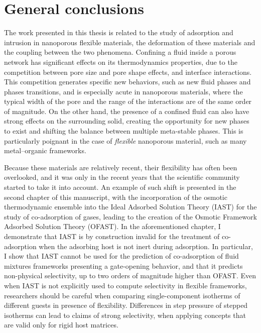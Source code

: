 
\chapter*{General conclusions}

The work presented in this thesis is related to the study of adsorption and
intrusion in nanoporous flexible materials, the deformation of these materials
and the coupling between the two phenomena. Confining a fluid inside a porous
network has significant effects on its thermodynamics properties, due to the
competition between pore size and pore shape effects, and interface
interactions. This competition generates specific new behaviors, such as new
fluid phases and phases transitions, and is especially acute in nanoporous
materials, where the typical width of the pore and the range of the interactions
are of the same order of magnitude. On the other hand, the presence of a
confined fluid can also have strong effects on the surrounding solid, creating the
opportunity for new phases to exist and shifting the balance between multiple
meta-stable phases. This is particularly poignant in the case of \emph{flexible}
nanoporous material, such as many metal--organic frameworks.

Because these materials are relatively recent, their flexibility has often been
overlooked, and it was only in the recent years that the scientific community
started to take it into account. An example of such shift is presented in the
second chapter of this manuscript, with the incorporation of the osmotic
thermodynamic ensemble into the Ideal Adsorbed Solution Theory (IAST) for the
study of co-adsorption of gases, leading to the creation of the Osmotic
Framework Adsorbed Solution Theory (OFAST). In the aforementioned chapter, I
demonstrate that IAST is by construction invalid for the treatment of
co-adsorption when the adsorbing host is not inert during adsorption. In
particular, I show that IAST cannot be used for the prediction of co-adsorption
of fluid mixtures frameworks presenting a gate-opening behavior, and that it
predicts non-physical selectivity, up to two orders of magnitude higher than
OFAST. Even when IAST is not explicitly used to compute selectivity in flexible
frameworks, researchers should be careful when comparing single-component
isotherms of different guests in presence of flexibility. Differences in step
pressure of stepped isotherms can lead to claims of strong selectivity, when
applying concepts that are valid only for rigid host matrices.

